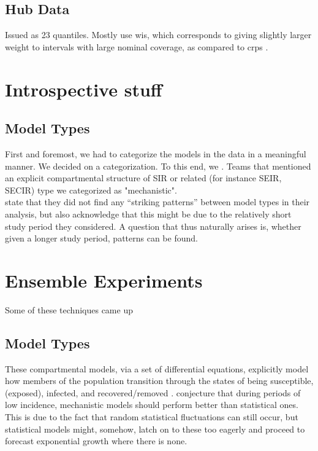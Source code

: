 \subsection{Hub Data}
Issued as 23 quantiles. Mostly use \ac{wis}, which corresponds to giving slightly larger weight to intervals with large nominal coverage, as compared to \ac{crps} \citep{bracher_evaluating_2021}.
\section{Introspective stuff}
\subsection{Model Types}
First and foremost, we had to categorize the models in the data in a meaningful manner. We decided on a categorization. To this end, we . Teams that mentioned an explicit compartmental structure of SIR or related (for instance SEIR, SECIR) type we categorized as "mechanistic".\\
\citep{bracher_evaluating_2021} state that they did not find any ``striking patterns'' between model types in their analysis, but also acknowledge that this might be due to the relatively short study period they considered. A question that thus naturally arises is, whether given a longer study period, patterns can be found.\\
\section{Ensemble Experiments}
Some of these techniques came up 
\subsection{Model Types}
These compartmental models, via a set of differential equations, explicitly model how members of the population transition through the states of being susceptible, (exposed), infected, and recovered/removed \cite{taylor_combining_2021}.
\cite{taylor_combining_2021} conjecture that during periods of low incidence, mechanistic models should perform better than statistical ones. This is due to the fact that random statistical fluctuations can still occur, but statistical models might, somehow, latch on to these too eagerly and proceed to forecast exponential growth where there is none.

